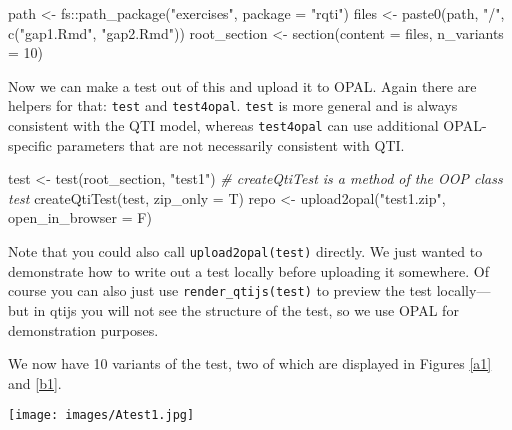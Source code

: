 \documentclass[twoside]{tufte-book}
\newenvironment{Shaded}{}{}
\newcommand{\AttributeTok}[1]{\textcolor[rgb]{0.49,0.56,0.16}{#1}}
\newcommand{\CommentTok}[1]{\textcolor[rgb]{0.38,0.63,0.69}{\textit{#1}}}
\newcommand{\DecValTok}[1]{\textcolor[rgb]{0.25,0.63,0.44}{#1}}
\newcommand{\FunctionTok}[1]{\textcolor[rgb]{0.02,0.16,0.49}{#1}}
\newcommand{\NormalTok}[1]{#1}
\newcommand{\OtherTok}[1]{\textcolor[rgb]{0.00,0.44,0.13}{#1}}
\newcommand{\SpecialCharTok}[1]{\textcolor[rgb]{0.25,0.44,0.63}{#1}}
\newcommand{\StringTok}[1]{\textcolor[rgb]{0.25,0.44,0.63}{#1}}
\begin{document}
\begin{Shaded}
\begin{Highlighting}[]
\NormalTok{path }\OtherTok{\textless{}{-}}\NormalTok{ fs}\SpecialCharTok{::}\FunctionTok{path\_package}\NormalTok{(}\StringTok{"exercises"}\NormalTok{, }\AttributeTok{package =} \StringTok{"rqti"}\NormalTok{)}
\NormalTok{files }\OtherTok{\textless{}{-}} \FunctionTok{paste0}\NormalTok{(path, }\StringTok{"/"}\NormalTok{, }\FunctionTok{c}\NormalTok{(}\StringTok{"gap1.Rmd"}\NormalTok{, }\StringTok{"gap2.Rmd"}\NormalTok{))}
\NormalTok{root\_section }\OtherTok{\textless{}{-}} \FunctionTok{section}\NormalTok{(}\AttributeTok{content =}\NormalTok{ files, }\AttributeTok{n\_variants =} \DecValTok{10}\NormalTok{)}
\end{Highlighting}
\end{Shaded}

Now we can make a test out of this and upload it to OPAL. Again there are helpers for that: \texttt{test} and \texttt{test4opal}. \texttt{test} is more general and is always consistent with the QTI model, whereas \texttt{test4opal} can use additional OPAL-specific parameters that are not necessarily consistent with QTI.

\begin{Shaded}
\begin{Highlighting}[]
\NormalTok{test }\OtherTok{\textless{}{-}} \FunctionTok{test}\NormalTok{(root\_section, }\StringTok{"test1"}\NormalTok{)}
\CommentTok{\# createQtiTest is a method of the OOP class \textasciigrave{}test\textasciigrave{}}
\FunctionTok{createQtiTest}\NormalTok{(test, }\AttributeTok{zip\_only =}\NormalTok{ T)}
\NormalTok{repo }\OtherTok{\textless{}{-}} \FunctionTok{upload2opal}\NormalTok{(}\StringTok{"test1.zip"}\NormalTok{, }\AttributeTok{open\_in\_browser =}\NormalTok{ F)}
\end{Highlighting}
\end{Shaded}

Note that you could also call \texttt{upload2opal(test)} directly. We just wanted to demonstrate how to write out a test locally before uploading it somewhere. Of course you can also just use \texttt{render\_qtijs(test)} to preview the test locally--- but in qtijs you will not see the structure of the test, so we use OPAL for demonstration purposes.

We now have 10 variants of the test, two of which are displayed in Figures \ref{a1} and \ref{b1}.

\begin{figure*}
\centering
\texttt{[image: images/Atest1.jpg]}
\caption{\label{a1}Test structure for seed 8833.}
\end{figure*}
\end{document}
